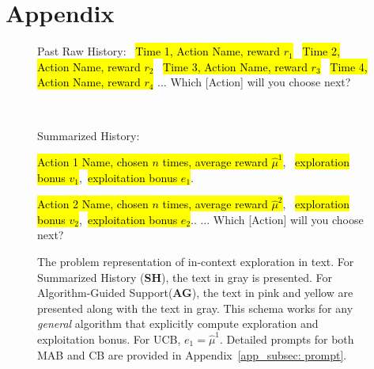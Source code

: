 \documentclass[11pt, logo]{googledeepmind}
\newcommand{\SH}{\textbf{SH}\xspace}
\newcommand{\AG}{\textbf{AG}\xspace}
\newcommand{\ag}{Algorithm-Guided Support\xspace}
\theoremstyle{plain}
\theoremstyle{definition}
\begin{document}
\section{Appendix}
\begin{figure}[h]
\noindent
\small
    \centering
  \begin{minipage}[t]{0.42\textwidth}
    \begin{tcolorbox} \newline
        [Instructions]  \newline
        Past Raw History: \newline
        ~\hl{Time 1, Action Name, reward $r_1$} \newline
        ~\hl{Time 2, Action Name, reward $r_2$} \newline
        ~\hl{Time 3, Action Name, reward $r_3$} \newline
        ~\hl{Time 4, Action Name, reward $r_4$} \newline
        ... \newline
        Which [Action] will you choose next?
    \end{tcolorbox}
\end{minipage}
~
\begin{minipage}[t]{0.56\textwidth}
\small
    \begin{tcolorbox}[colback=gray!5!white, colframe=gray!75!black, title=Summarized History with \ag]
  [Scenario Description] \newline
  [Instructions]  \newline
    Summarized History: \newline
    \parbox{\linewidth}{\hl{Action 1 Name, chosen $n$ times, average reward $\hat \mu^{1}$},~\hl{ exploration bonus $v_1$},~\hl{exploitation bonus $e_1$}.} \newline
     \hl{Action 2 Name, chosen $n$ times, average reward $\hat \mu^{2}$},~\hl{ exploration bonus $v_2$},~\hl{exploitation bonus $e_2$}.. \newline
    ... \newline
    Which [Action] will you choose next?
    \end{tcolorbox}
\end{minipage}
    \caption{\footnotesize{The problem representation of in-context exploration in text. For Summarized History (\SH), the text in gray is presented. For \ag (\AG), the text in pink and yellow are presented along with the text in gray. This schema works for any \textit{general} algorithm that explicitly compute exploration and exploitation bonus. For UCB, $e_1 = \hat\mu^1$. Detailed prompts for both MAB and CB are provided in Appendix~\ref{app_subsec: prompt}.}}
    \label{fig:prompt}
\end{figure}
\end{document}
